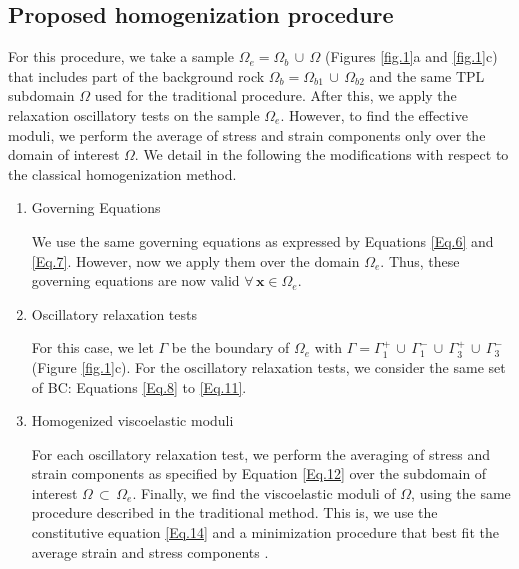 \documentclass[draft]{agujournal2019}
\begin{document}
\subsection{Proposed homogenization procedure}
For this procedure, we take a sample $\Omega_e = \Omega_b \,\cup\, \Omega$ (Figures \ref{fig.1}a and \ref{fig.1}c) that includes part of the background rock $\Omega_b = \Omega_{b1}\, \cup \, \Omega_{b2} $ and the same TPL subdomain $\Omega$ used for the traditional procedure. After this, we apply the relaxation oscillatory tests on the sample $\Omega_e$. However, to find the effective moduli, we perform the average of stress and strain components only over the domain of interest  $\Omega$. We detail in the following the modifications with respect to the classical homogenization method.

\begin{enumerate}
\setlength\itemsep{1em}
\item Governing Equations

We use the same governing equations as expressed by Equations \eqref{Eq.6} and \eqref{Eq.7}. However, now we apply them over the domain $\Omega_e$. Thus, these governing equations are now valid $ \forall \, \bm{x} \in \Omega_e$.
\\

\item Oscillatory relaxation tests

For this case, we let $\Gamma$ be the boundary of $\Omega_e$ with  $\Gamma = \Gamma_1^+ \,\cup \,\Gamma_1^- \,\cup \,\Gamma_3^+ \, \cup \, \Gamma_3^- $ (Figure \ref{fig.1}c).
For the oscillatory relaxation tests, we consider the same set of BC: Equations \eqref{Eq.8} to \eqref{Eq.11}. 
\\

\item Homogenized viscoelastic moduli

For each oscillatory relaxation test, we perform the averaging of stress and strain components as specified by Equation \eqref{Eq.12} over the subdomain of interest $\Omega \,\subset \, \Omega_e$. Finally, we find the viscoelastic moduli of $\Omega$, using the same procedure described in the traditional method. This is, we use the constitutive equation \eqref{Eq.14} and a minimization procedure that best fit the average strain and stress components \cite{Rubino2016}. 

\end{enumerate}


\end{document}
